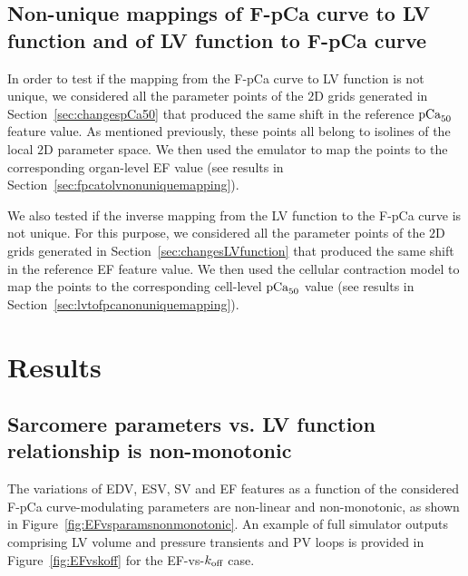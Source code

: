 %
%
%
\subsection{Non-unique mappings of F-pCa curve to LV function and of LV function to F-pCa curve}
In order to test if the mapping from the F-pCa curve to LV function is not unique, we considered all the parameter points of the $2$D grids generated in Section~\ref{sec:changespCa50} that produced the same shift in the reference $\textrm{pCa}_{50}$ feature value. As mentioned previously, these points all belong to isolines of the local $2$D parameter space. We then used the emulator to map the points to the corresponding organ-level EF value (see results in Section~\ref{sec:fpcatolvnonuniquemapping}).

\vspace{0.2cm}
We also tested if the inverse mapping from the LV function to the F-pCa curve is not unique. For this purpose, we considered all the parameter points of the $2$D grids generated in Section~\ref{sec:changesLVfunction} that produced the same shift in the reference EF feature value. We then used the cellular contraction model to map the points to the corresponding cell-level $\textrm{pCa}_{50}$ value (see results in Section~\ref{sec:lvtofpcanonuniquemapping}).


%
%
%
\section{Results}


%
%
%
\subsection{Sarcomere parameters vs. LV function relationship is non-monotonic}
The variations of EDV, ESV, SV and EF features as a function of the considered F-pCa curve-modulating parameters are non-linear and non-monotonic, as shown in Figure~\ref{fig:EFvsparamsnonmonotonic}. An example of full simulator outputs comprising LV volume and pressure transients and PV loops is provided in Figure~\ref{fig:EFvskoff} for the EF-vs-$k_{\textrm{off}}$ case.

